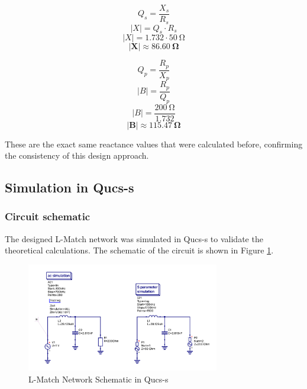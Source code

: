\begin{equation}
    Q_s = \frac{X_s}{R_s}
\end{equation}
\begin{equation}
    |X| = Q_s \cdot R_s
\end{equation}
\begin{equation}
    |X| = 1.732 \cdot \SI{50}{\ohm}
\end{equation}
\begin{equation}
    \mathbf{|X| \approx \SI{86.60}{\ohm}}
\end{equation}

\begin{equation}
    Q_p = \frac{R_p}{X_p}
\end{equation}
\begin{equation}
    |B| = \frac{R_p}{Q_p}
\end{equation}
\begin{equation}
    |B| = \frac{\SI{200}{\ohm}}{1.732}
\end{equation}
\begin{equation}
    \mathbf{|B| \approx \SI{115.47}{\ohm}}
\end{equation}

These are the exact same reactance values that were calculated before, confirming the consistency of this design approach.

\subsection{Simulation in Qucs-s}

\subsubsection{Circuit schematic}
The designed L-Match network was simulated in Qucs-s to validate the theoretical calculations. The schematic of the circuit is shown in Figure \ref{fig:qucs_lmatch}.

\begin{figure}[H]
    \centering
    \includegraphics[width=0.75\textwidth]{Images/Qucs_LMatch.png}
    \caption{L-Match Network Schematic in Qucs-s}
    \label{fig:qucs_lmatch}
\end{figure}

